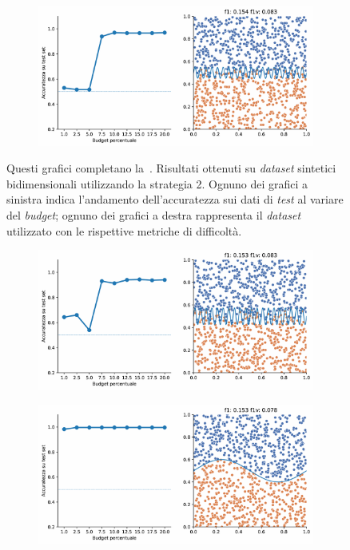 \begin{appendices}
\begin{figure}[ht]
\begin{subfigure}{.8\textwidth}
    \end{subfigure}%
    \hfill
    \begin{subfigure}{.8\textwidth}
        \centering
        \includegraphics[width=\textwidth]{img/2d_v2/8.pdf}
    \end{subfigure}%
    \caption[Risultati su \emph{dataset} sintetici utilizzando la strategia 2.]{Questi grafici completano la~. Risultati ottenuti su \emph{dataset} sintetici bidimensionali utilizzando la strategia 2. Ognuno dei grafici a sinistra indica l'andamento dell'accuratezza sui dati di \emph{test} al variare del \emph{budget}; ognuno dei grafici a destra rappresenta il \emph{dataset} utilizzato con le rispettive metriche di difficoltà.}
\end{figure}
\begin{figure}[ht]\ContinuedFloat
    \centering
    \begin{subfigure}{.8\textwidth}
        \centering
        \includegraphics[width=\textwidth]{img/2d_v2/9.pdf}
    \end{subfigure}
    \hfill
    \begin{subfigure}{.8\textwidth}
        \centering
        \includegraphics[width=\textwidth]{img/2d_v2/10.pdf}

\end{subfigure}
\end{figure}
\end{appendices}
